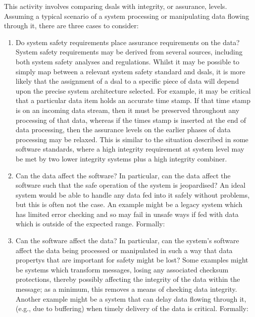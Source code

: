 This activity involves comparing \glspl{dsal} with \gls{integrity}, or assurance, levels. Assuming a typical scenario of a system processing or manipulating data flowing through it, there are three cases to consider:

\begin{enumerate}
  \item Do system safety requirements place assurance
  requirements on the data? System safety requirements may be derived from
  several sources, including both system safety analyses and regulations.
  Whilst it may be possible to simply map between a relevant system safety
  standard and \glspl{dsal}, it is more likely that the assignment of a \gls{dsal} to a
  specific piece of data will depend upon the precise system architecture
  selected. For example, it may be critical that a particular data item
  holds an accurate time stamp. If that time stamp is on an incoming data
  stream, then it must be preserved throughout any processing of that
  data, whereas if the times stamp is inserted at the end of data
  processing, then the assurance levels on the earlier phases of data
  processing may be relaxed. This is similar to the situation described in
  some software standards, where a high \gls{integrity} requirement at system
  level may be met by two lower \gls{integrity} systems plus a high \gls{integrity}
  combiner.
  \item Can the data affect the software? In particular, can the data affect the software such that the safe operation of the system is jeopardised? An ideal system would be able to handle any data fed into it safely without problems, but this is often not the case. An example might be a legacy system which has limited error checking and so may fail in unsafe ways if fed with data which is outside of the expected range. Formally: 
  \item Can the software affect the data? In particular, can the system's software affect the data being processed or manipulated in such a way that \glspl{data property} that are important for safety might be lost? Some examples might be systems which transform messages, losing any associated checksum protections, thereby possibly affecting the \gls{integrity} of the data within the message; as a minimum, this removes a means of checking data \gls{integrity}. Another example might be a system that can delay data flowing through it, (e.g., due to buffering) when timely delivery of the data is critical. Formally:\ 
\end{enumerate}


